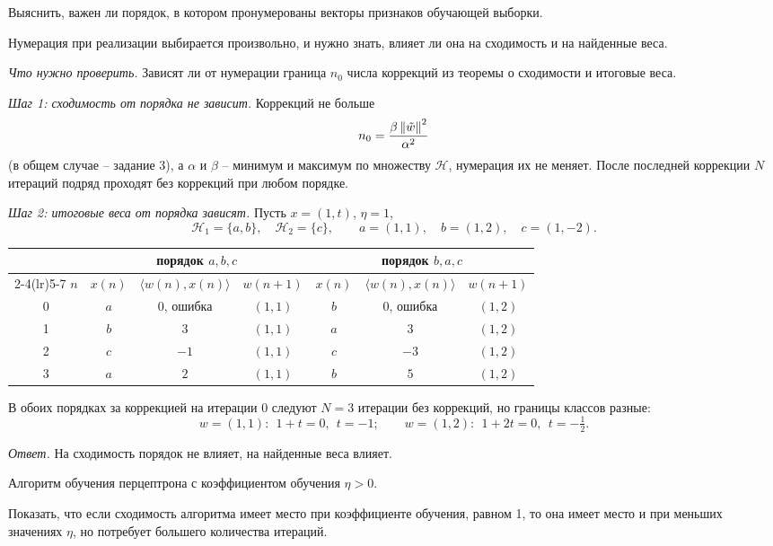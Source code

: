 \documentclass[12pt,a4paper]{article}
\begin{document}
\treb Выяснить, важен ли порядок, в котором пронумерованы векторы признаков
обучающей выборки.

\zachem Нумерация при реализации выбирается произвольно, и нужно знать, влияет ли
она на сходимость и на найденные веса.

\resh \emph{Что нужно проверить.} Зависят ли от нумерации граница $n_0$ числа
коррекций из теоремы о сходимости и итоговые веса.

\emph{Шаг 1: сходимость от порядка не зависит.} Коррекций не больше
\[
  n_0 = \frac{\beta\left\lVert \tilde{w} \right\rVert^2}{\alpha^2}
\]
(в общем случае -- задание 3), а $\alpha$ и $\beta$ -- минимум и максимум по
множеству $\mathcal{H}$, нумерация их не меняет. После последней коррекции $N$
итераций подряд проходят без коррекций при любом порядке.

\emph{Шаг 2: итоговые веса от порядка зависят.} Пусть $x = (1, t)$, $\eta = 1$,
\[
  \mathcal{H}_1 = \{a, b\}, \quad \mathcal{H}_2 = \{c\}, \qquad
  a = (1, 1), \quad b = (1, 2), \quad c = (1, -2) .
\]
\begin{center}
\begin{tabular}{ccccccc}
\toprule
 & \multicolumn{3}{c}{порядок $a, b, c$} & \multicolumn{3}{c}{порядок $b, a, c$} \\
\cmidrule(lr){2-4}\cmidrule(lr){5-7}
$n$ & $x(n)$ & $\langle w(n), x(n)\rangle$ & $w(n+1)$
    & $x(n)$ & $\langle w(n), x(n)\rangle$ & $w(n+1)$ \\
\midrule
0 & $a$ & $0$, ошибка & $(1, 1)$ & $b$ & $0$, ошибка & $(1, 2)$ \\
1 & $b$ & $3$ & $(1, 1)$ & $a$ & $3$ & $(1, 2)$ \\
2 & $c$ & $-1$ & $(1, 1)$ & $c$ & $-3$ & $(1, 2)$ \\
3 & $a$ & $2$ & $(1, 1)$ & $b$ & $5$ & $(1, 2)$ \\
\bottomrule
\end{tabular}
\end{center}
В обоих порядках за коррекцией на итерации 0 следуют $N = 3$ итерации без
коррекций, но границы классов разные:
\[
  w = (1, 1):\ \ 1 + t = 0,\ \ t = -1;
  \qquad
  w = (1, 2):\ \ 1 + 2t = 0,\ \ t = -\tfrac12 .
\]

\emph{Ответ.} На сходимость порядок не влияет, на найденные веса влияет.

\dano Алгоритм обучения перцептрона с коэффициентом обучения $\eta > 0$.

\treb Показать, что если сходимость алгоритма имеет место при коэффициенте
обучения, равном 1, то она имеет место и при меньших значениях $\eta$, но
потребует большего количества итераций.
\end{document}
